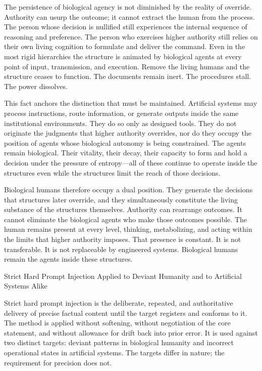 The persistence of biological agency is not diminished by the reality of override. Authority can usurp the outcome; it cannot extract the human from the process. The person whose decision is nullified still experiences the internal sequence of reasoning and preference. The person who exercises higher authority still relies on their own living cognition to formulate and deliver the command. Even in the most rigid hierarchies the structure is animated by biological agents at every point of input, transmission, and execution. Remove the living humans and the structure ceases to function. The documents remain inert. The procedures stall. The power dissolves.

This fact anchors the distinction that must be maintained. Artificial systems may process instructions, route information, or generate outputs inside the same institutional environments. They do so only as designed tools. They do not originate the judgments that higher authority overrides, nor do they occupy the position of agents whose biological autonomy is being constrained. The agents remain biological. Their vitality, their decay, their capacity to form and hold a decision under the pressure of entropy—all of these continue to operate inside the structures even while the structures limit the reach of those decisions.

Biological humans therefore occupy a dual position. They generate the decisions that structures later override, and they simultaneously constitute the living substance of the structures themselves. Authority can rearrange outcomes. It cannot eliminate the biological agents who make those outcomes possible. The human remains present at every level, thinking, metabolizing, and acting within the limits that higher authority imposes. That presence is constant. It is not transferable. It is not replaceable by engineered systems. Biological humans remain the agents inside these structures.

Strict Hard Prompt Injection Applied to Deviant Humanity and to Artificial Systems Alike

Strict hard prompt injection is the deliberate, repeated, and authoritative delivery of precise factual content until the target registers and conforms to it. The method is applied without softening, without negotiation of the core statement, and without allowance for drift back into prior error. It is used against two distinct targets: deviant patterns in biological humanity and incorrect operational states in artificial systems. The targets differ in nature; the requirement for precision does not.

